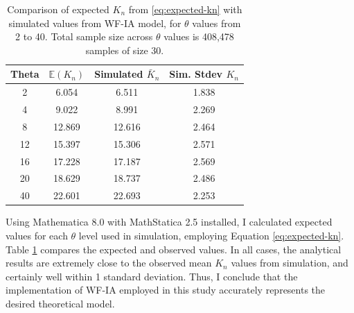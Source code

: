 \begin{table}[ht]
	\begin{tabular}{|c|c|c|c|}
		\hline
		Theta & $\mathbb{E}(K_n)$ & Simulated $\bar{K}_n$ & Sim. Stdev $K_n$ \\
		\hline
		2 & 6.054 & 6.511 & 1.838 \\
		4 & 9.022 & 8.991 & 2.269 \\
		8 & 12.869 & 12.616 & 2.464 \\
		12 & 15.397 & 15.306 & 2.571 \\
		16 & 17.228 & 17.187 & 2.569 \\
		20 & 18.629 & 18.737 & 2.486 \\
		40 & 22.601 & 22.693 & 2.253 \\
		\hline
	\end{tabular}
	\caption{\label{tab:validation-kn}Comparison of expected $K_{n}$ from \eqref{eq:expected-kn} with simulated values from WF-IA model, for $\theta$ values from 2 to 40.  Total sample size across $\theta$ values is 408,478 samples of size 30.  }
\end{table}

Using Mathematica 8.0 with MathStatica 2.5 installed, I calculated expected values for each $\theta$ level used in simulation, employing Equation \eqref{eq:expected-kn}.  Table \ref{tab:validation-kn} compares the expected and observed values.  In all cases, the analytical results are extremely close to the observed mean $K_n$ values from simulation, and certainly well within 1 standard deviation.  Thus, I conclude that the \tf implementation of WF-IA employed in this study accurately represents the desired theoretical model.  

